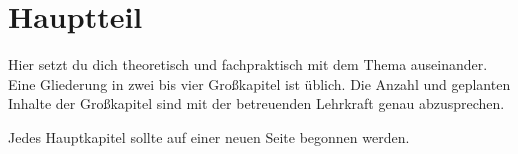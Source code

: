 \chapter{Hauptteil}
\label{cha:hauptteil}

Hier setzt du dich theoretisch und fachpraktisch mit dem Thema auseinander. Eine Gliederung in zwei bis vier Großkapitel ist üblich. Die Anzahl und geplanten Inhalte der Großkapitel sind mit der betreuenden Lehrkraft genau abzusprechen.

Jedes Hauptkapitel sollte auf einer neuen Seite begonnen werden.
